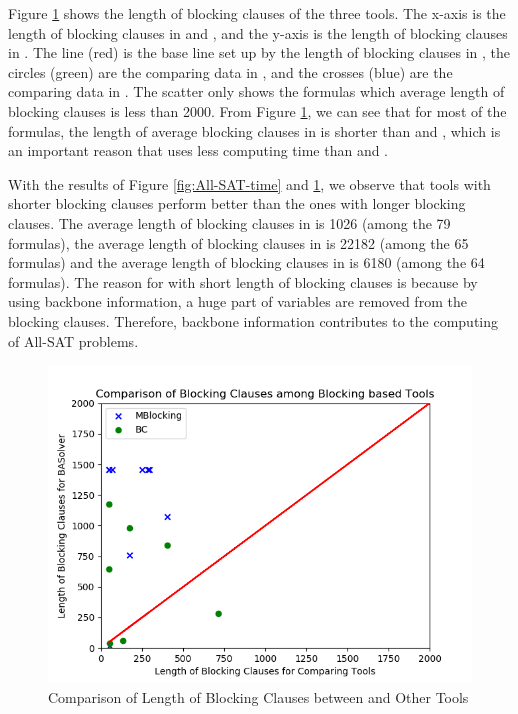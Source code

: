Figure \ref{fig:All-SAT-blk} shows the length of blocking clauses of the three tools. The x-axis is the length of blocking clauses in \ctool and \bc, and the y-axis is the length of blocking clauses in \tool. The line (red) is the base line set up by the length of blocking clauses in \tool, the circles (green) are the comparing data in \bc, and the crosses (blue) are the comparing data in \ctool. The scatter only shows the formulas which average length of blocking clauses is less than 2000. From Figure \ref{fig:All-SAT-blk}, we can see that for most of the formulas, the length of average blocking clauses in \tool is shorter than \ctool and \bc, which is an important reason that \tool uses less computing time than \ctool and \bc.

With the results of Figure \ref{fig:All-SAT-time} and \ref{fig:All-SAT-blk}, we observe that tools with shorter blocking clauses perform better than the ones with longer blocking clauses.
The average length of blocking clauses in \tool is 1026 (among the 79 formulas), the average length of blocking clauses in \ctool is 22182 (among the 65 formulas) and the average length of blocking clauses in \bc is 6180 (among the 64 formulas).
The reason for \tool with short length of blocking clauses is because by using backbone information, a huge part of variables are removed from the blocking clauses. Therefore, backbone information contributes to the computing of All-SAT problems.

\begin{figure}
    \centering
    \includegraphics[scale=0.5]{allsat-blk.png}
    \caption{Comparison of Length of Blocking Clauses between \tool and Other Tools}
    \label{fig:All-SAT-blk}
\end{figure}

